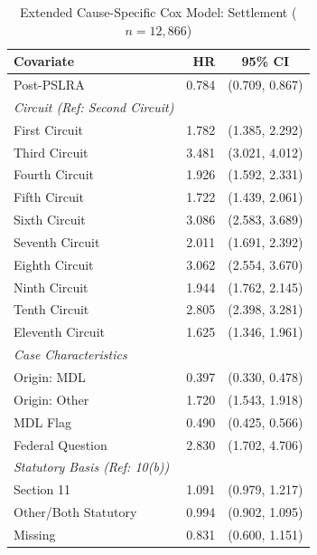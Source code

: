 \begin{table}[htbp]
\centering
\caption[Extended Cause-Specific Cox Model: Settlement]{Extended Cause-Specific Cox Model: Settlement ($n = 12{,}866$)}
\label{tab:cox_ext_settle}
\renewcommand{\arraystretch}{1.2}
\begin{tabular*}{\textwidth}{@{\extracolsep{\fill}} l r c @{}}
\toprule
\textbf{Covariate} & \textbf{HR} & \textbf{95\% CI} \\
\midrule
Post-PSLRA            & 0.784 & (0.709, 0.867) \\
\addlinespace[0.5em]
\textit{Circuit (Ref: Second Circuit)} & & \\
First Circuit         &  1.782 & (1.385, 2.292) \\
Third Circuit         &  3.481 & (3.021, 4.012) \\
Fourth Circuit        &  1.926 & (1.592, 2.331) \\
Fifth Circuit         &  1.722 & (1.439, 2.061) \\
Sixth Circuit         &  3.086 & (2.583, 3.689) \\
Seventh Circuit       &  2.011 & (1.691, 2.392) \\
Eighth Circuit        &  3.062 & (2.554, 3.670) \\
Ninth Circuit         &  1.944 & (1.762, 2.145) \\
Tenth Circuit         &  2.805 & (2.398, 3.281) \\
Eleventh Circuit      &  1.625 & (1.346, 1.961) \\
\addlinespace[0.5em]
\textit{Case Characteristics} & & \\
Origin: MDL           &  0.397 & (0.330, 0.478) \\
Origin: Other         &  1.720 & (1.543, 1.918) \\
MDL Flag              &  0.490 & (0.425, 0.566) \\
Federal Question      &  2.830 & (1.702, 4.706) \\
\addlinespace[0.5em]
\textit{Statutory Basis (Ref: 10(b))} & & \\
Section 11            &  1.091 & (0.979, 1.217) \\
Other/Both Statutory  &  0.994 & (0.902, 1.095) \\
Missing               &  0.831 & (0.600, 1.151) \\
\bottomrule
\end{tabular*}
\end{table}

